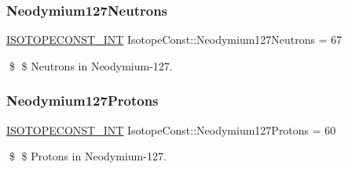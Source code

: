 \subsubsection{\texorpdfstring{Neodymium127\+Neutrons}{Neodymium127Neutrons}}
{\footnotesize\ttfamily \mbox{\hyperlink{group___isotope_const-_macros_ga5f18360b3e99483a35c32d789e62621c}{I\+S\+O\+T\+O\+P\+E\+C\+O\+N\+S\+T\+\_\+\+I\+NT}} Isotope\+Const\+::\+Neodymium127\+Neutrons = 67}

\$ \$ Neutrons in Neodymium-\/127. \mbox{\label{group___isotope_const-_neodymium-_nd127_gaf0071a5b77dd9d4f7b145c4b82b37dd8}} 
\subsubsection{\texorpdfstring{Neodymium127\+Protons}{Neodymium127Protons}}
{\footnotesize\ttfamily \mbox{\hyperlink{group___isotope_const-_macros_ga5f18360b3e99483a35c32d789e62621c}{I\+S\+O\+T\+O\+P\+E\+C\+O\+N\+S\+T\+\_\+\+I\+NT}} Isotope\+Const\+::\+Neodymium127\+Protons = 60}

\$ \$ Protons in Neodymium-\/127. 